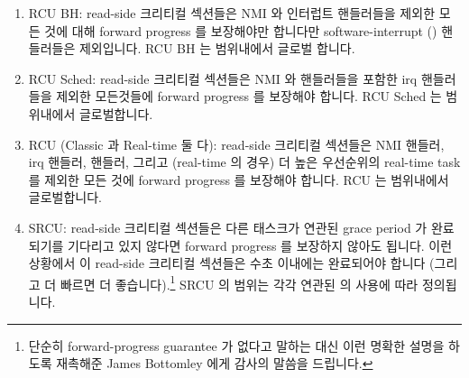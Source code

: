 \begin{enumerate}
\item	RCU BH: read-side 크리티컬 섹션들은 NMI 와 인터럽트 핸들러들을 제외한
	모든 것에 대해 forward progress 를 보장해야만 합니다만
	software-interrupt () 핸들러들은 제외입니다.
	RCU BH 는 범위내에서 글로벌 합니다.
\item	RCU Sched: read-side 크리티컬 섹션들은 NMI 와  핸들러들을
	포함한 irq 핸들러들을 제외한 모든것들에 forward progress 를 보장해야
	합니다.
	RCU Sched 는 범위내에서 글로벌합니다.
\item	RCU (Classic 과 Real-time 둘 다): read-side 크리티컬 섹션들은 NMI
	핸들러, irq 핸들러,  핸들러, 그리고 (real-time 의 경우) 더
	높은 우선순위의 real-time task 를 제외한 모든 것에 forward progress 를
	보장해야 합니다.
	RCU 는 범위내에서 글로벌합니다.
\item	SRCU: read-side 크리티컬 섹션들은 다른 태스크가 연관된 grace
	period 가 완료되기를 기다리고 있지 않다면 forward progress 를 보장하지
	않아도 됩니다. 이런 상황에서 이 read-side 크리티컬 섹션들은 수초
	이내에는 완료되어야 합니다 (그리고 더 빠르면 더 좋습니다).\footnote{
		단순히 forward-progress guarantee 가 없다고 말하는 대신 이런
		명확한 설명을 하도록 재촉해준 James Bottomley 에게 감사의
		말씀을 드립니다.}
	SRCU 의 범위는 각각 연관된  의 사용에 따라 정의됩니다.
\iffalse

\item	RCU BH: read-side critical sections
	must guarantee forward progress against everything except for
	NMI and interrupt handlers, but not including software-interrupt
	(\co{softirq}) handlers.
	RCU BH is global in scope.
\item	RCU Sched: read-side critical sections must guarantee forward
	progress against everything except for NMI and irq handlers,
	including \co{softirq} handlers.
	RCU Sched is global in scope.
\item	RCU (both classic and real-time): read-side critical sections
	must guarantee forward progress against everything except for
	NMI handlers, irq handlers, \co{softirq} handlers, and (in the
	real-time case) higher-priority real-time tasks.
	RCU is global in scope.
\item	SRCU: read-side critical sections need not guarantee
	forward progress unless some other task is waiting for the
	corresponding grace period to complete, in which case these
	read-side critical sections should complete in no more than
	a few seconds (and preferably much more quickly).\footnote{
		Thanks to James Bottomley for urging me to this
		formulation, as opposed to simply saying that
		there are no forward-progress guarantees.}
	SRCU's scope is defined by the use of the corresponding
	\co{srcu_struct}.
\fi
\end{enumerate}

